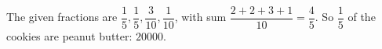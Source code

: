 The given fractions are $\dfrac{1}{5},\dfrac{1}{5},\dfrac{3}{10},\dfrac{1}{10}$, with sum $\dfrac{2+2+3+1}{10}=\dfrac{4}{5}$. So $\dfrac{1}{5}$ of the cookies are peanut butter: $\boxed{20000}$.
